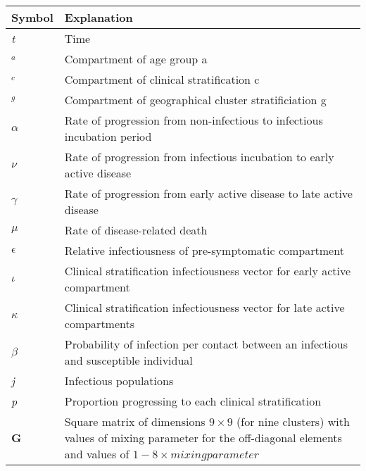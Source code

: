 \begin{table}[ht]
\renewcommand{\baselinestretch}{1}
    	\begin{tabular}{| p{2cm} | p{11.1cm} |}
    	\hline
    		Symbol & Explanation \\
    		\hline
    		\textit{t} & Time  \\
    		$_{\textit{a}}$ & Compartment of age group a \\
    		$_{\textit{c}}$ & Compartment of clinical stratification c \\
    		$_{\textit{g}}$ & Compartment of geographical cluster stratificiation g \\
    		$\alpha$ & Rate of progression from non-infectious to infectious incubation period \\
    		$\nu$ & Rate of progression from infectious incubation to early active disease \\
    		$\gamma$ & Rate of progression from early active disease to late active disease \\
    		$\mu$ & Rate of disease-related death \\
    		$\epsilon$ & Relative infectiousness of pre-symptomatic compartment \\
    		$\iota$ & Clinical stratification infectiousness vector for early active compartment \\
    		$\kappa$ & Clinical stratification infectiousness vector for late active compartments \\
    		$\beta$ & Probability of infection per contact between an infectious and susceptible individual \\
	    	\textit{j} & Infectious populations \\
    		\textit{p} & Proportion progressing to each clinical stratification \\
    		\textbf{G} & Square matrix of dimensions \(9 \times 9\) (for nine clusters) with values of mixing parameter for the off-diagonal elements and values of \(1-8\times mixing parameter\) \\
    \hline
	\end{tabular}
\end{table}

